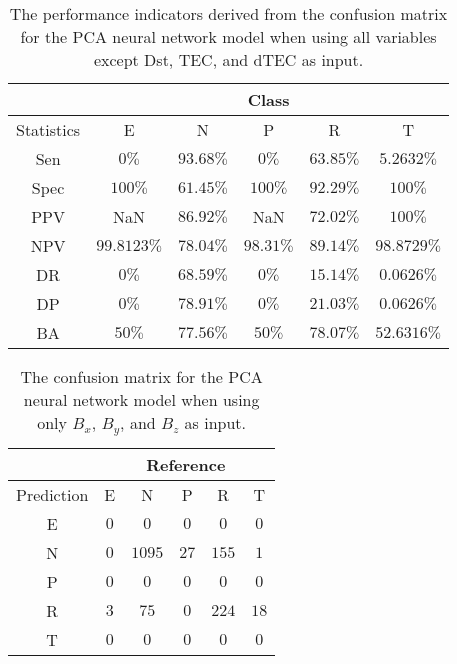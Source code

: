 \begin{table}[!ht]
	\centering
	\begin{tabular}{|c|c|c|c|c|c|}
		\hline
		 & \multicolumn{5}{c|}{Class} \\ \hline
		Statistics & E & N & P & R & T \\ \hline
		Sen & $0\%$ & $93.68\%$ & $0\%$ & $63.85\%$ & $5.2632\%$ \\ \hline
		Spec & $100\%$ & $61.45\%$ & $100\%$ & $92.29\%$ & $100\%$ \\ \hline
		PPV & NaN & $86.92\%$ & NaN & $72.02\%$ & $100\%$ \\ \hline
		NPV & $99.8123\%$ & $78.04\%$ & $98.31\%$ & $89.14\%$ & $98.8729\%$ \\ \hline
		DR & $0\%$ & $68.59\%$ & $0\%$ & $15.14\%$ & $0.0626\%$ \\ \hline
		DP & $0\%$ & $78.91\%$ & $0\%$ & $21.03\%$ & $0.0626\%$ \\ \hline
		BA & $50\%$ & $77.56\%$ & $50\%$ & $78.07\%$ & $52.6316\%$ \\ \hline
	\end{tabular}
	\caption{The performance indicators derived from the confusion matrix for the PCA neural network model when using all variables except Dst, TEC, and dTEC as input.}
	\label{tab:cs:reverse:noTEC:pcaNNet}
\end{table}

\begin{table}[!ht]
	\centering
	\begin{tabular}{|c|c|c|c|c|c|}
		\hline
		 & \multicolumn{5}{|c|}{Reference} \\ \hline
		 Prediction & E & N & P & R & T \\ \hline
		 E & $0$ & $0$ & $0$ & $0$ & $0$ \\ \hline
		 N & $0$ & $1095$ & $27$ & $155$ & $1$ \\ \hline
		 P & $0$ & $0$ & $0$ & $0$ & $0$ \\ \hline
		 R & $3$ & $75$ & $0$ & $224$ & $18$ \\ \hline
		 T & $0$ & $0$ & $0$ & $0$ & $0$ \\ \hline
	\end{tabular}
	\caption{The confusion matrix for the PCA neural network model when using only $B_{x}$, $B_{y}$, and $B_{z}$ as input.}
	\label{tab:cm:coord:pcaNNet}
\end{table}

